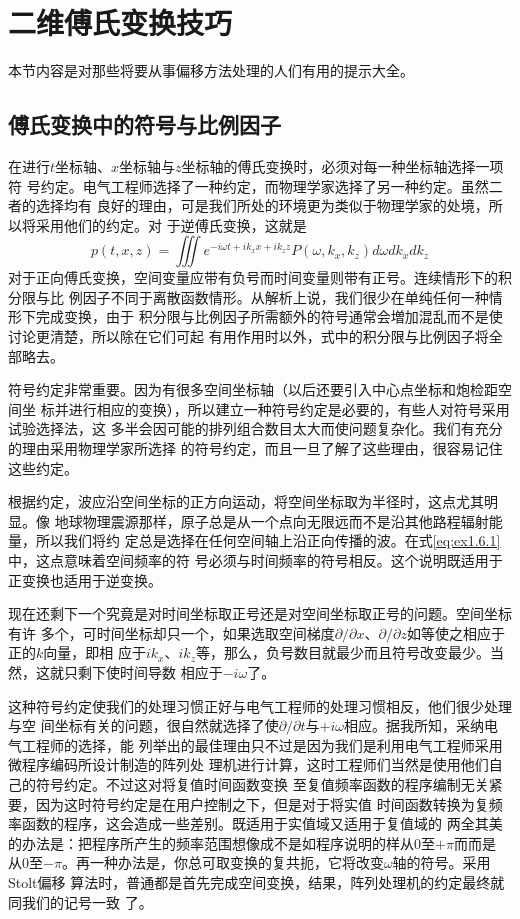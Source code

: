 \section{二维傅氏变换技巧}
本节内容是对那些将要从事偏移方法处理的人们有用的提示大全。
\subsection{傅氏变换中的符号与比例因子}
在进行$t$坐标轴、$x$坐标轴与$z$坐标轴的傅氏变换时，必须对每一种坐标轴选择一项符
号约定。电气工程师选择了一种约定，而物理学家选择了另一种约定。虽然二者的选择均有
良好的理由，可是我们所处的环境更为类似于物理学家的处境，所以将采用他们的约定。对
于逆傅氏变换，这就是
\begin{equation}
p(t,x,z)=\iiint e^{-i\omega t+ik_xx+ik_zz}P(\omega,k_x,k_z)d\omega dk_x dk_z
\label{eq:ex1.6.1}
\end{equation}
对于正向傅氏变换，空间变量应带有负号而时间变量则带有正号。连续情形下的积分限与比
例因子不同于离散函数情形。从解析上说，我们很少在单纯任何一种情形下完成变换，由于
积分限与比例因子所需额外的符号通常会増加混乱而不是使讨论更清楚，所以除在它们可起
有用作用时以外，式中的积分限与比例因子将全部略去。

符号约定非常重要。因为有很多空间坐标轴（以后还要引入中心点坐标和炮检距空间坐
标并进行相应的变换），所以建立一种符号约定是必要的，有些人对符号采用试验选择法，这
多半会因可能的排列组合数目太大而使问题复杂化。我们有充分的理由采用物理学家所选择
的符号约定，而且一旦了解了这些理由，很容易记住这些约定。

根据约定，波应沿空间坐标的正方向运动，将空间坐标取为半径时，这点尤其明显。像
地球物理震源那样，原子总是从一个点向无限远而不是沿其他路程辐射能量，所以我们将约
定总是选择在任何空间轴上沿正向传播的波。在式\ref{eq:ex1.6.1}中，这点意味着空间频率的符
号必须与时间频率的符号相反。这个说明既适用于正变换也适用于逆变换。

现在还剩下一个究竟是对时间坐标取正号还是对空间坐标取正号的问题。空间坐标有许
多个，可时间坐标却只一个，如果选取空间梯度$\partial/\partial x$、$\partial/\partial z$如等使之相应于正的$k$向量，即相
应于$ik_x$、$ik_z$等，那么，负号数目就最少而且符号改变最少。当然，这就只剩下使时间导数
相应于$-i\omega$了。

这种符号约定使我们的处理习惯正好与电气工程师的处理习惯相反，他们很少处理与空
间坐标有关的问题，很自然就选择了使$\partial/\partial t$与$+i\omega$相应。据我所知，采纳电气工程师的选择，能
列举出的最佳理由只不过是因为我们是利用电气工程师采用微程序编码所设计制造的阵列处
理机进行计算，这时工程师们当然是使用他们自己的符号约定。不过这对将复值时间函数变换
至复值频率函数的程序编制无关紧要，因为这时符号约定是在用户控制之下，但是对于将实值
时间函数转换为复频率函数的程序，这会造成一些差别。既适用于实值域又适用于复值域的
两全其美的办法是：把程序所产生的频率范围想像成不是如程序说明的样从0至$+\pi$而而是
从0至$-\pi$。再一种办法是，你总可取变换的复共扼，它将改变$\omega$轴的符号。采用Stolt偏移
算法时，普通都是首先完成空间变换，结果，阵列处理机的约定最终就同我们的记号一致
了。

